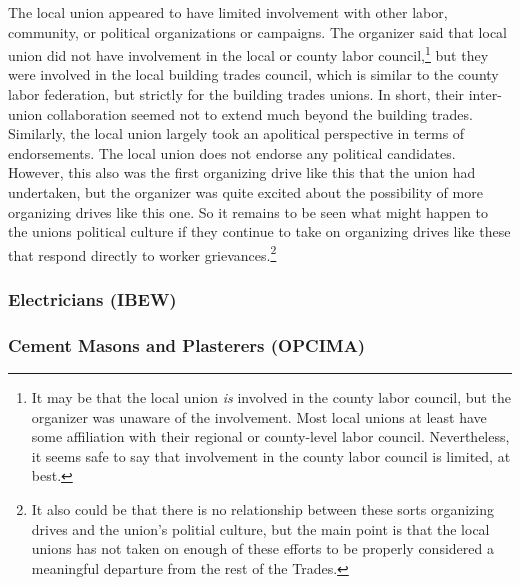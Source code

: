 \documentclass[12pt]{article}
\begin{document}
The local union appeared to have limited involvement with other labor, community, or political organizations or campaigns. The organizer said that local union did not have involvement in the local or county labor council,\footnote{It may be that the local union \emph{is} involved in the county labor council, but the organizer was unaware of the involvement. Most local unions at least have some affiliation with their regional or county-level labor council. Nevertheless, it seems safe to say that involvement in the county labor council is limited, at best.} but they were involved in the local building trades council, which is similar to the county labor federation, but strictly for the building trades unions. In short, their inter-union collaboration seemed not to extend much beyond the building trades. Similarly, the local union largely took an apolitical perspective in terms of endorsements. The local union does not endorse any political candidates. However, this also was the first organizing drive like this that the union had undertaken, but the organizer was quite excited about the possibility of more organizing drives like this one. So it remains to be seen what might happen to the unions political culture if they continue to take on organizing drives like these that respond directly to worker grievances.\footnote{It also could be that there is no relationship between these sorts organizing drives and the union's politial culture, but the main point is that the local unions has not taken on enough of these efforts to be properly considered a meaningful departure from the rest of the Trades.}

\subsubsection{Electricians (IBEW)}



\subsubsection{Cement Masons and Plasterers (OPCIMA)}


\newpage

\titleformat{\section}{\fontsize{12}{14}\bfseries\centering}{\thesection}{0.5em}{}
\printbibliography[heading=bibintoc]


\printglossary[type=\acronymtype]
\end{document}
